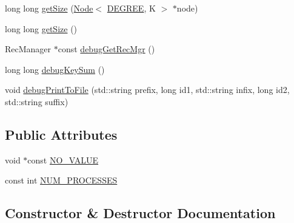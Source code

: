 \begin{DoxyCompactItemize}
\item 
long long \hyperlink{classbslack__ns_1_1bslack_a3878b7dd717d5960c94c31668b1c2f4d}{get\+Size} (\hyperlink{structbslack__ns_1_1Node}{Node}$<$ \hyperlink{brown__sigouin__abtree__kcas_2adapter_8h_a5d88b17d70c985f2f2b8e987037fd6dd}{D\+E\+G\+R\+EE}, K $>$ $\ast$node)
\item 
long long \hyperlink{classbslack__ns_1_1bslack_a8f52a836192f30c567310f13c3671dc5}{get\+Size} ()
\item 
Rec\+Manager $\ast$const \hyperlink{classbslack__ns_1_1bslack_a957555a6a1a9fe89a4d23e7961e87c3d}{debug\+Get\+Rec\+Mgr} ()
\item 
long long \hyperlink{classbslack__ns_1_1bslack_a609ab93b6e3788584c5e9504d6463b02}{debug\+Key\+Sum} ()
\item 
void \hyperlink{classbslack__ns_1_1bslack_a095d4f4661d03b7515845262bdaef196}{debug\+Print\+To\+File} (std\+::string prefix, long id1, std\+::string infix, long id2, std\+::string suffix)
\end{DoxyCompactItemize}
\subsection*{Public Attributes}
\begin{DoxyCompactItemize}
\item 
void $\ast$const \hyperlink{classbslack__ns_1_1bslack_a224a18105742df2b9e9d3c71a9dfed10}{N\+O\+\_\+\+V\+A\+L\+UE}
\item 
const int \hyperlink{classbslack__ns_1_1bslack_ab6c3d7c3c21780189d88f79cddaeee00}{N\+U\+M\+\_\+\+P\+R\+O\+C\+E\+S\+S\+ES}
\end{DoxyCompactItemize}


\subsection{Constructor \& Destructor Documentation}
\mbox{\label{classbslack__ns_1_1bslack_ab563f1ab8920fa875eae3742731ca082}} 
